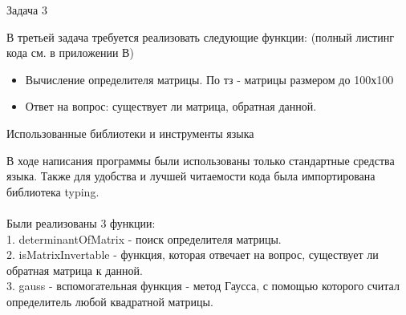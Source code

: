 \begin{large}
	Задача 3\\
\end{large}
В третьей задача требуется реализовать следующие функции: (полный листинг кода см. в приложении В)
\begin{itemize}
	\item Вычисление определителя матрицы. По тз - матрицы размером до 100х100
	\item Ответ на вопрос: существует ли матрица, обратная данной.
\end{itemize}
\begin{large}
	Использованные библиотеки и инструменты языка\\
\end{large}
В ходе написания программы были использованы только стандартные средства языка. Также для удобства и лучшей читаемости кода была импортирована библиотека typing.\\ \\
Были реализованы 3 функции:\\
1. determinantOfMatrix - поиск определителя матрицы.\\
2. isMatrixInvertable - функция, которая отвечает на вопрос, существует ли обратная матрица к данной.\\
3. gauss - вспомогательная функция - метод Гаусса, с помощью которого считал определитель любой квадратной матрицы.\vspace{2cm}

